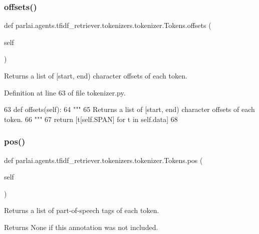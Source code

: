 \subsubsection{\texorpdfstring{offsets()}{offsets()}}
{\footnotesize\ttfamily def parlai.\+agents.\+tfidf\+\_\+retriever.\+tokenizers.\+tokenizer.\+Tokens.\+offsets (\begin{DoxyParamCaption}\item[{}]{self }\end{DoxyParamCaption})}

\begin{DoxyVerb}Returns a list of [start, end) character offsets of each token.
\end{DoxyVerb}
 

Definition at line 63 of file tokenizer.\+py.


\begin{DoxyCode}
63     \textcolor{keyword}{def }offsets(self):
64         \textcolor{stringliteral}{"""}
65 \textcolor{stringliteral}{        Returns a list of [start, end) character offsets of each token.}
66 \textcolor{stringliteral}{        """}
67         \textcolor{keywordflow}{return} [t[self.SPAN] \textcolor{keywordflow}{for} t \textcolor{keywordflow}{in} self.data]
68 
\end{DoxyCode}
\mbox{\label{classparlai_1_1agents_1_1tfidf__retriever_1_1tokenizers_1_1tokenizer_1_1Tokens_a5aa226b8190b5e72dbe0515caf0a21d6}} 
\subsubsection{\texorpdfstring{pos()}{pos()}}
{\footnotesize\ttfamily def parlai.\+agents.\+tfidf\+\_\+retriever.\+tokenizers.\+tokenizer.\+Tokens.\+pos (\begin{DoxyParamCaption}\item[{}]{self }\end{DoxyParamCaption})}

\begin{DoxyVerb}Returns a list of part-of-speech tags of each token.

Returns None if this annotation was not included.
\end{DoxyVerb}
 

